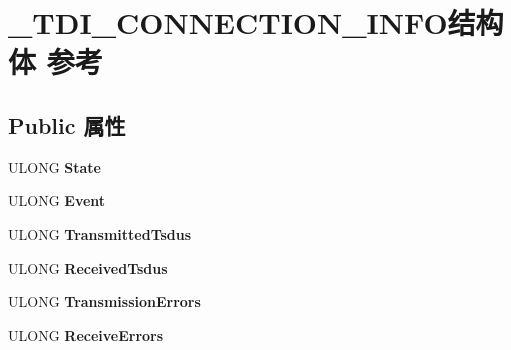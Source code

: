 \hypertarget{struct___t_d_i___c_o_n_n_e_c_t_i_o_n___i_n_f_o}{}\section{\+\_\+\+T\+D\+I\+\_\+\+C\+O\+N\+N\+E\+C\+T\+I\+O\+N\+\_\+\+I\+N\+F\+O结构体 参考}
\label{struct___t_d_i___c_o_n_n_e_c_t_i_o_n___i_n_f_o}
\subsection*{Public 属性}
\begin{DoxyCompactItemize}
\item 
\mbox{\label{struct___t_d_i___c_o_n_n_e_c_t_i_o_n___i_n_f_o_a80cd97d24f4a31ece45cd9d39419416f}} 
U\+L\+O\+NG {\bfseries State}
\item 
\mbox{\label{struct___t_d_i___c_o_n_n_e_c_t_i_o_n___i_n_f_o_ae41b43e531d8beaeb6a37b061197e402}} 
U\+L\+O\+NG {\bfseries Event}
\item 
\mbox{\label{struct___t_d_i___c_o_n_n_e_c_t_i_o_n___i_n_f_o_a7d2213fe094772cd3d0d51e60f616656}} 
U\+L\+O\+NG {\bfseries Transmitted\+Tsdus}
\item 
\mbox{\label{struct___t_d_i___c_o_n_n_e_c_t_i_o_n___i_n_f_o_a8aa7e08cc0ed10a7a28b519abe736253}} 
U\+L\+O\+NG {\bfseries Received\+Tsdus}
\item 
\mbox{\label{struct___t_d_i___c_o_n_n_e_c_t_i_o_n___i_n_f_o_a0c8b9f3e1ecf1b8632eb4e7b4fe63dee}} 
U\+L\+O\+NG {\bfseries Transmission\+Errors}
\item 
\mbox{\label{struct___t_d_i___c_o_n_n_e_c_t_i_o_n___i_n_f_o_adcaba508ad6d8de3f4c8ecceae70bafa}} 
U\+L\+O\+NG {\bfseries Receive\+Errors}
\item 
\mbox{\label{struct___t_d_i___c_o_n_n_e_c_t_i_o_n___i_n_f_o_a717c3f2adafa007a1ff62e175e627c6e}} 

\end{DoxyCompactItemize}
